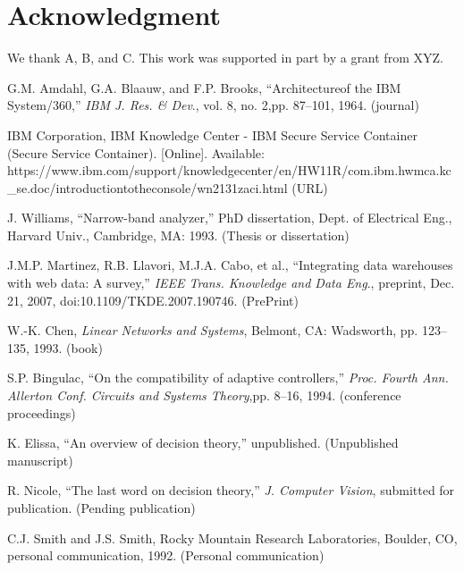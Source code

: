 \documentclass[]{IEEEibm}
\begin{document}
\section{Acknowledgment}

We thank A, B, and C. This work was supported in part by a grant from XYZ.


\begin{thebibliography}{1}

G.M. Amdahl, G.A. Blaauw, and F.P. Brooks, ``Architecture\break of the IBM System/360,'' {\it IBM J. Res. \& Dev}., vol. 8, no. 2,\break pp. 87--101, 1964. (journal)

IBM Corporation, IBM Knowledge Center - IBM Secure Service Container (Secure Service Container). [Online]. Available: {https://www.ibm.com/support/knowledgecenter/en/HW11R/\break com.ibm.hwmca.kc\_se.doc/introductiontotheconsole/wn2131zaci.html} (URL)

J. Williams, ``Narrow-band analyzer,'' PhD dissertation, Dept. of Electrical Eng., Harvard Univ., Cambridge, MA: 1993. (Thesis or dissertation)

J.M.P. Martinez, R.B. Llavori, M.J.A. Cabo, et al., ``Integrating data warehouses with web data: A survey,'' {\it IEEE Trans. Knowledge and Data Eng}., preprint, Dec. 21, 2007, doi:10.1109/TKDE.2007.190746. (PrePrint)

W.-K. Chen, {\it Linear Networks and Systems}, Belmont, CA: Wadsworth, pp. 123--135, 1993. (book)\vadjust{\vfill\pagebreak}

S.P. Bingulac, ``On the compatibility of adaptive controllers,'' {\it Proc. Fourth Ann. Allerton Conf. Circuits and Systems Theory},\break pp. 8--16, 1994. (conference proceedings)

K. Elissa, ``An overview of decision theory,'' unpublished. (Unpublished manuscript)

R. Nicole, ``The last word on decision theory,'' {\it J. Computer Vision}, submitted for publication. (Pending publication)

C.J. Smith and J.S. Smith, Rocky Mountain Research Laboratories, Boulder, CO, personal communication, 1992. (Personal communication)
\end{thebibliography}
\end{document}
